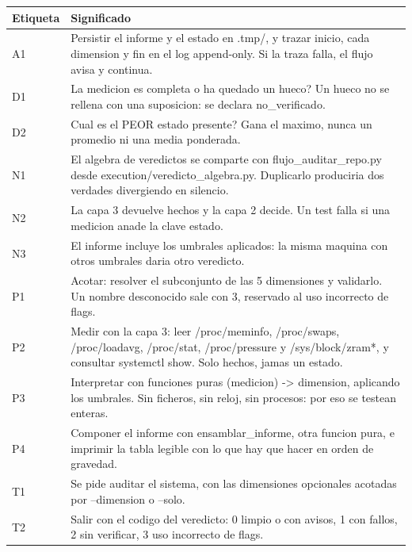 \documentclass[11pt,a4paper]{article}
\begin{document}
\vspace{6pt}
\begin{tcolorbox}[cajaContenido, title={\faIcon{table}~Leyenda de etiquetas}]
\small
\begin{tabularx}{\linewidth}{@{}>{\centering\arraybackslash}p{1.4cm}X@{}}
\toprule
\textbf{Etiqueta} & \textbf{Significado} \\ \midrule
A1 & Persistir el informe y el estado en .tmp/, y trazar inicio, cada dimension y fin en el log append-only. Si la traza falla, el flujo avisa y continua. \\
D1 & La medicion es completa o ha quedado un hueco? Un hueco no se rellena con una suposicion: se declara no\_verificado. \\
D2 & Cual es el PEOR estado presente? Gana el maximo, nunca un promedio ni una media ponderada. \\
N1 & El algebra de veredictos se comparte con flujo\_auditar\_repo.py desde execution/veredicto\_algebra.py. Duplicarlo produciria dos verdades divergiendo en silencio. \\
N2 & La capa 3 devuelve hechos y la capa 2 decide. Un test falla si una medicion anade la clave estado. \\
N3 & El informe incluye los umbrales aplicados: la misma maquina con otros umbrales daria otro veredicto. \\
P1 & Acotar: resolver el subconjunto de las 5 dimensiones y validarlo. Un nombre desconocido sale con 3, reservado al uso incorrecto de flags. \\
P2 & Medir con la capa 3: leer /proc/meminfo, /proc/swaps, /proc/loadavg, /proc/stat, /proc/pressure y /sys/block/zram*, y consultar systemctl show. Solo hechos, jamas un estado. \\
P3 & Interpretar con funciones puras (medicion) -> dimension, aplicando los umbrales. Sin ficheros, sin reloj, sin procesos: por eso se testean enteras. \\
P4 & Componer el informe con ensamblar\_informe, otra funcion pura, e imprimir la tabla legible con lo que hay que hacer en orden de gravedad. \\
T1 & Se pide auditar el sistema, con las dimensiones opcionales acotadas por --dimension o --solo. \\
T2 & Salir con el codigo del veredicto: 0 limpio o con avisos, 1 con fallos, 2 sin verificar, 3 uso incorrecto de flags. \\
\bottomrule
\end{tabularx}
\end{tcolorbox}
\end{document}
